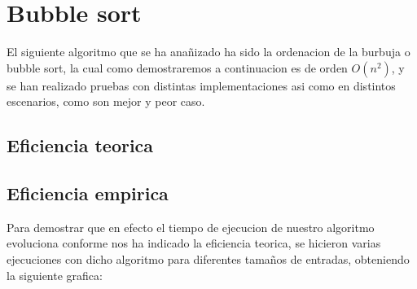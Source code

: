 \section{Bubble sort}
El siguiente algoritmo que se ha anañizado ha sido la ordenacion de la burbuja o bubble sort, la cual como demostraremos a continuacion es de orden $O(n^{2})$, y se han realizado pruebas con distintas implementaciones asi como en distintos escenarios, como son mejor y peor caso.

\subsection{Eficiencia teorica}


\subsection{Eficiencia empirica}
Para demostrar que en efecto el tiempo de ejecucion de nuestro algoritmo evoluciona conforme nos ha indicado la eficiencia teorica, se hicieron varias ejecuciones con dicho algoritmo para diferentes tamaños de entradas, obteniendo la siguiente grafica:

